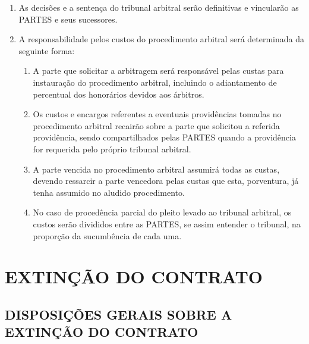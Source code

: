 \documentclass[a4paper,11pt]{report} %
\begin{document}
\begin{enumerate}
\begin{enumerate}[label*=\arabic*.]
\item \label{itm:N8QM} As decisões e a sentença do tribunal arbitral serão definitivas e vincularão as PARTES e seus sucessores.
\item \label{itm:UHYE} A responsabilidade pelos custos do procedimento arbitral será determinada da seguinte forma:

\begin{enumerate}[label*=\arabic*.]
\item \label{itm:NJGG} A parte que solicitar a arbitragem será responsável pelas custas para instauração do procedimento arbitral, incluindo o adiantamento de percentual dos honorários devidos aos árbitros.

\item \label{itm:KM8X} Os custos e encargos referentes a eventuais providências tomadas no procedimento arbitral recairão sobre a parte que solicitou a referida providência, sendo compartilhados pelas PARTES quando a providência for requerida pelo próprio tribunal arbitral.

\item \label{itm:D4E6} A parte vencida no procedimento arbitral assumirá todas as custas, devendo ressarcir a parte vencedora pelas custas que esta, porventura, já tenha assumido no aludido procedimento.

\item \label{itm:DE8Q} No caso de procedência parcial do pleito levado ao tribunal arbitral, os custos serão divididos entre as PARTES, se assim entender o tribunal, na proporção da sucumbência de cada uma.
\end{enumerate}
\end{enumerate}
\end{enumerate}

\chapter{EXTINÇÃO DO CONTRATO}
\section{DISPOSIÇÕES GERAIS SOBRE A EXTINÇÃO DO CONTRATO}
\label{sec:8FA3}
\end{document}

